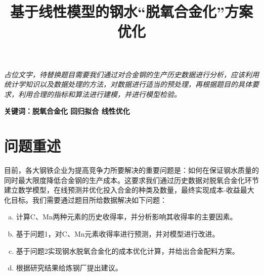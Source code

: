 \documentclass{xcumcmart}
\title{基于线性模型的钢水“脱氧合金化”方案优化}
\begin{document}
\renewcommand\arraystretch{2}

\maketitle
\begin{cnabstract}%
\setlength{\parskip}{1.4em} %

\par \textit{占位文字，待替换题目需要我们通过对合金钢的生产历史数据进行分析，应该利用统计学知识以及数据处理的方法，对数据进行适当的预处理，再根据题目的具体要求，利用合理的指标和算法进行建模，并进行模型检验。}
\par \textbf{关键词：脱氧合金化 回归拟合 线性优化}
\end{cnabstract}

\setlength{\parskip}{1.4em}

\section{问题重述}
\par 目前，各大钢铁企业为提高竞争力所要解决的重要问题是：如何在保证钢水质量的同时最大限度降低合金钢的生产成本。这要求我们通过历史数据对脱氧合金化环节建立数学模型，在线预测并优化投入合金的种类及数量，最终实现成本-收益最大化目标。我们需要通过题目所给数据解决如下问题：
\begin{enumerate}[(a)]%
\setlength{\itemindent}{2em}    %
\item 计算C、Mn两种元素的历史收得率，并分析影响其收得率的主要因素。
\item 基于问题1，对C、Mn元素收得率进行预测，并对模型进行改进。
\item 基于问题2实现钢水脱氧合金化的成本优化计算，并给出合金配料方案。
\item 根据研究结果给炼钢厂提出建议。
\end{enumerate}
\end{document}
